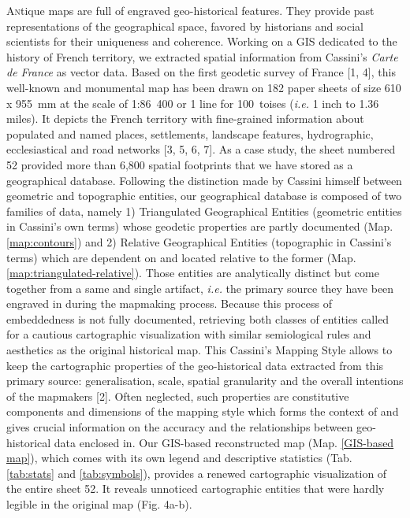 \documentclass[portrait,a0]{sciposter}
\begin{document}
\begin{minipage}[b]{\textwidth}
\begin{multicols}{3}
\lettrine{A}ntique maps are full of engraved geo-historical features. They provide past representations of the geographical space, favored by historians and social scientists for their uniqueness and coherence. Working on a GIS dedicated to the history of French territory, we extracted spatial information from Cassini’s \textit{Carte de France} as vector data. Based on the first geodetic survey of France [1, 4], this well-known and monumental map has been drawn on 182 paper sheets of size 610 x 955~mm at the scale of 1:86~400 or 1 line for 100~toises (\textit{i.e.} 1 inch to 1.36 miles). It depicts the French territory with fine-grained information about populated and named places, settlements, landscape features, hydrographic, ecclesiastical and road networks [3, 5, 6, 7]. As a case study, the sheet numbered 52 provided more than 6,800 spatial footprints that we have stored as a geographical database. Following the distinction made by Cassini himself between \og geometric \fg and \og topographic \fg entities, our geographical database is composed of two families of data, namely 1) Triangulated Geographical Entities (\og geometric \fg entities in Cassini’s own terms) whose geodetic properties are partly documented (Map. \ref{map:contours}) and 2) Relative Geographical Entities (\og topographic \fg in Cassini’s terms) which are dependent on and located relative to the former (Map. \ref{map:triangulated-relative}). Those entities are analytically distinct but come together from a same and single artifact, \emph{i.e.} the primary source they have been engraved in during the mapmaking process. Because this process of embeddedness is not fully documented, retrieving both classes of entities called for a cautious cartographic visualization with similar semiological rules and aesthetics as the original historical map. This \og Cassini's Mapping Style \fg allows to keep the cartographic properties of the geo-historical data extracted from this primary source: generalisation, scale, spatial granularity and the overall intentions of the mapmakers [2]. Often neglected, such properties are constitutive components and dimensions of the mapping style which forms the context of and gives crucial information on the accuracy and the relationships between geo-historical data enclosed in. Our GIS-based reconstructed map (Map. \ref{GIS-based map}),  which comes with its own legend and descriptive statistics (Tab. \ref{tab:stats} and \ref{tab:symbols}), provides a renewed cartographic visualization of the entire sheet 52. It reveals unnoticed cartographic entities that were hardly legible in the original map (Fig. 4a-b).\\
\vfill



\end{multicols}
\end{minipage}
\end{document}
